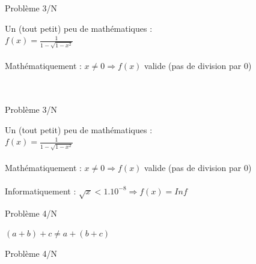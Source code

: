 \documentclass{beamer}
\begin{document}
    \begin{frame}{Problème 3/N} 
    \begin{center}
    Un (tout petit) peu de mathématiques : \\
      $f(x) = \frac{1}{1-\sqrt{1-x^{2}}}$ \\
      \textcolor{white}{ } \\
      Mathématiquement : $x \neq 0 \Rightarrow f(x)$ valide (pas de division par 0) \\
      \textcolor{white}{ } \\
      \textcolor{white}{ } \\
     \end{center}
  \end{frame}

    \begin{frame}{Problème 3/N} 
    \begin{center}
    Un (tout petit) peu de mathématiques : \\
      $f(x) = \frac{1}{1-\sqrt{1-x^{2}}}$ \\
      \textcolor{white}{ } \\
      Mathématiquement : $x \neq 0 \Rightarrow f(x)$ valide (pas de division par 0) \\
      \textcolor{white}{ } \\
      Informatiquement : $\sqrt{x} < 1.10^{-8} \Rightarrow f(x) = Inf$
     \end{center}
  \end{frame}
  
  
  \begin{frame}{Problème 4/N} 
  \begin{Huge}
  \begin{center}
  $(a+b)+c \neq a+(b+c)$ \\
  \end{center}
  \end{Huge}
  \end{frame}
  
  \begin{frame}{Problème 4/N} 
  \randomassociativity
  \end{frame}
  
\end{document}
